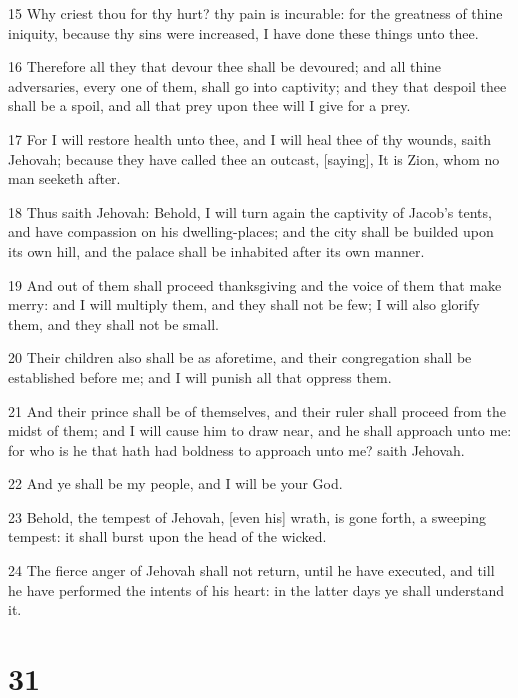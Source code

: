 \par 15 Why criest thou for thy hurt? thy pain is incurable: for the greatness of thine iniquity, because thy sins were increased, I have done these things unto thee.
\par 16 Therefore all they that devour thee shall be devoured; and all thine adversaries, every one of them, shall go into captivity; and they that despoil thee shall be a spoil, and all that prey upon thee will I give for a prey.
\par 17 For I will restore health unto thee, and I will heal thee of thy wounds, saith Jehovah; because they have called thee an outcast, [saying], It is Zion, whom no man seeketh after.
\par 18 Thus saith Jehovah: Behold, I will turn again the captivity of Jacob's tents, and have compassion on his dwelling-places; and the city shall be builded upon its own hill, and the palace shall be inhabited after its own manner.
\par 19 And out of them shall proceed thanksgiving and the voice of them that make merry: and I will multiply them, and they shall not be few; I will also glorify them, and they shall not be small.
\par 20 Their children also shall be as aforetime, and their congregation shall be established before me; and I will punish all that oppress them.
\par 21 And their prince shall be of themselves, and their ruler shall proceed from the midst of them; and I will cause him to draw near, and he shall approach unto me: for who is he that hath had boldness to approach unto me? saith Jehovah.
\par 22 And ye shall be my people, and I will be your God.
\par 23 Behold, the tempest of Jehovah, [even his] wrath, is gone forth, a sweeping tempest: it shall burst upon the head of the wicked.
\par 24 The fierce anger of Jehovah shall not return, until he have executed, and till he have performed the intents of his heart: in the latter days ye shall understand it.

\chapter{31}

